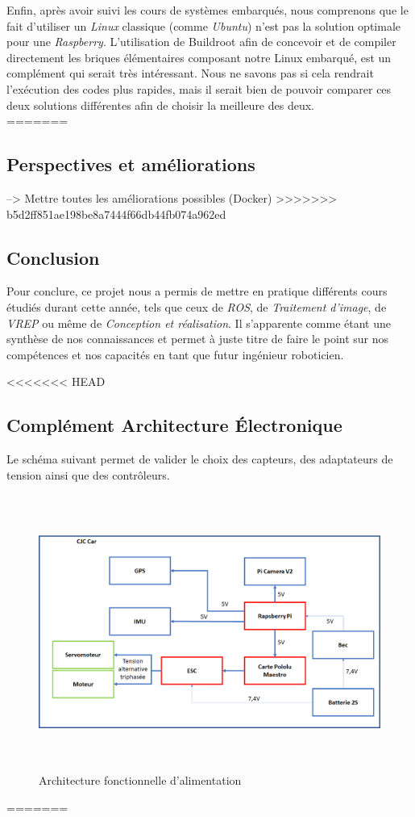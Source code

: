 \documentclass[12pt, openany]{report}
\begin{document}
Enfin, après avoir suivi les cours de systèmes embarqués, nous comprenons que le fait d'utiliser un \textit{Linux} classique (comme \textit{Ubuntu}) n'est pas la solution optimale pour une \textit{Raspberry}. L'utilisation de Buildroot afin de concevoir et de compiler directement les briques élémentaires composant notre Linux embarqué, est un complément qui serait très intéressant. Nous ne savons pas si cela rendrait l'exécution des codes plus rapides, mais il serait bien de pouvoir comparer ces deux solutions différentes afin de choisir la meilleure des deux.\\
=======
\section{Perspectives et améliorations}
--> Mettre toutes les améliorations possibles (Docker)
>>>>>>> b5d2ff851ae198be8a7444f66db44fb074a962ed

\section*{Conclusion}
Pour conclure, ce projet nous a permis de mettre en pratique différents cours étudiés durant cette année, tels que ceux de \textit{ROS}, de \textit{Traitement d'image}, de \textit{VREP} ou même de \textit{Conception et réalisation}. Il s'apparente comme étant une synthèse de nos connaissances et permet à juste titre de faire le point sur nos compétences et nos capacités en tant que futur ingénieur roboticien.\\
\pagebreak

<<<<<<< HEAD
\begin{appendix}
    \chapter{Complément Architecture Électronique}
    \label{carchf}
Le schéma suivant permet de valider le choix des capteurs, des adaptateurs de tension ainsi que des contrôleurs.\\
\begin{figure}[H]
     \centering
     \includegraphics[width=13cm, height = 9cm]{Archi fonct tension.png}
     \caption{Architecture fonctionnelle d'alimentation}
     \label{fig:arch_compl}
\end{figure}
\end{appendix}
=======
\end{document}
